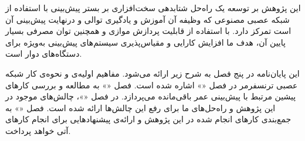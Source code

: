 
این پژوهش بر توسعه یک راه‌حل شتابدهی سخت‌افزاری بر بستر  پیش‌بینی   با استفاده از شبکه عصبی مصنوعی که وظیفه آن آموزش و یادگیری توالی و درنهایت پیش‌بینی آن است تمرکز دارد. با استفاده از قابلیت پردازش موازی  و همچنین توان مصرفی بسیار پایین آن، هدف ما افزایش کارایی و مقیاس‌پذیری سیستم‌های پیش‌بینی  به‌ویژه برای دستگاه‌های دوار است.







این پایان‌نامه در پنج فصل به شرح زیر ارائه می‌شود.
مفاهیم اولیه‌ی و نحوه‌ی کار شبکه عصبی ترنسفرمر در فصل «» اشاره شده است. 
فصل «» به مطالعه و بررسی کارهای پیشین مرتبط با پیش‌بینی عمر باقی‌مانده می‌پردازد.
در فصل «»، چالش‌های موجود در این پژوهش و راه‌حل‌های ما برای رفع این چالش‌ها ارائه شده است.
فصل «» به جمع‌بندی کارهای انجام شده در این پژوهش و ارائه‌ی پیشنهادهایی برای انجام کارهای آتی خواهد پرداخت.